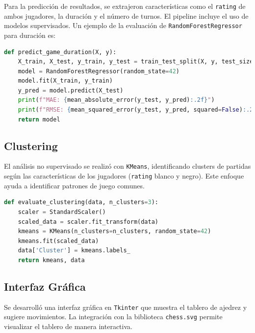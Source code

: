 \documentclass[a4paper,12pt]{article}
\begin{document}
Para la predicción de resultados, se extrajeron características como el \texttt{rating} de ambos jugadores, la duración y el número de turnos. El pipeline incluye el uso de modelos supervisados. Un ejemplo de la evaluación de \texttt{RandomForestRegressor} para duración es:

\begin{lstlisting}[language=Python]
def predict_game_duration(X, y):
    X_train, X_test, y_train, y_test = train_test_split(X, y, test_size=0.3, random_state=42)
    model = RandomForestRegressor(random_state=42)
    model.fit(X_train, y_train)
    y_pred = model.predict(X_test)
    print(f"MAE: {mean_absolute_error(y_test, y_pred):.2f}")
    print(f"RMSE: {mean_squared_error(y_test, y_pred, squared=False):.2f}")
    return model
\end{lstlisting}

\subsection{Clustering}

El análisis no supervisado se realizó con \texttt{KMeans}, identificando clusters de partidas según las características de los jugadores (\texttt{rating} blanco y negro). Este enfoque ayuda a identificar patrones de juego comunes.

\begin{lstlisting}[language=Python]
def evaluate_clustering(data, n_clusters=3):
    scaler = StandardScaler()
    scaled_data = scaler.fit_transform(data)
    kmeans = KMeans(n_clusters=n_clusters, random_state=42)
    kmeans.fit(scaled_data)
    data['Cluster'] = kmeans.labels_
    return kmeans, data
\end{lstlisting}

\newpage
\subsection{Interfaz Gráfica}

Se desarrolló una interfaz gráfica en \texttt{Tkinter} que muestra el tablero de ajedrez y sugiere movimientos. La integración con la biblioteca \texttt{chess.svg} permite visualizar el tablero de manera interactiva.
\end{document}
